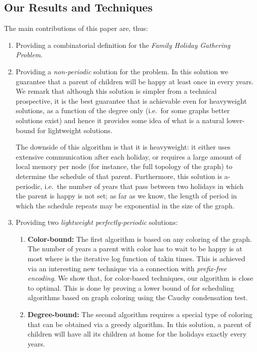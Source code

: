\documentclass[11pt]{article}
\begin{document}
\subsection{Our Results and Techniques}
The main contributions of this paper are, thus:
\begin{enumerate}
\item Providing a combinatorial definition for the {\em Family Holiday
 Gathering Problem}.
\item Providing a \emph{non-periodic} solution for the
  problem. In this solution we guarantee that a parent of  children
  will be happy at least once in every  years. We remark that although this solution is simpler from a technical prospective, it is the best guarantee that is achievable even for heavyweight solutions, as a function of the degree only (i.e.\ for some graphs better solutions exist) and hence it provides some idea of what is a natural lower-bound for lightweight solutions.

 The downside of this algorithm is that it is heavyweight:  it either uses extensive
 communication after each holiday, or requires a large  amount of
 local memory per node (for instance, the full topology of the graph) to determine the schedule of that parent. Furthermore, this solution is a-periodic,
 i.e.\ the number of years that pass between two holidays in which the
 parent is happy is not set;
as far as we know, the length of period in which the schedule repeats may be exponential in the size of the graph.

\item Providing two {\em lightweight perfectly-periodic} solutions:
\begin{enumerate}
\item
{\bf Color-bound:} The first algorithm is based on any coloring of the
graph. The number of years a parent with color  has to wait to be happy
is at most  where  is the iterative log function of  takin  times. This is achieved via an interesting
new technique via a connection with {\em prefix-free encoding}. We show that, for color-based techniques, our algorithm is {close to}
optimal. This is done by proving a lower bound of  for scheduling algorithms based on
graph coloring using the Cauchy condensation test.
\item
{\bf Degree-bound:} The second algorithm requires a special type of
coloring that can be obtained via a greedy algorithm. In this
solution, a parent of  children will have all its children at home
for the holidays exactly every 
years.
 \end{enumerate}
\end{enumerate}
\end{document}
